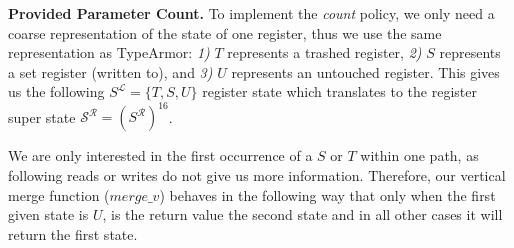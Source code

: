 %
%

\textbf{Provided Parameter Count.}
\label{subsection:providedparamcount}
To implement the \emph{count} policy, we only need a coarse representation of the state of one register, 
thus we use the same representation as TypeArmor:
\textit{1)} $T$ represents a trashed register,
\textit{2)} $S$ represents a set register (written to), and
\textit{3)} $U$ represents an untouched register.
This gives us the following $S^\mathcal{L} = \{ T, S, U \}$  register state which translates to the register super state $\mathcal{S}^\mathcal{R} = (S^\mathcal{R})^{16}$.

We are only interested in the first occurrence of a $S$ or $T$ within one path, as following reads or writes do not give us more information. 
Therefore, our vertical merge function ($merge\_v$) behaves in the following way that only when the first given state is $U$, is the return value the 
second state and in all other cases it will return the first state.
%


